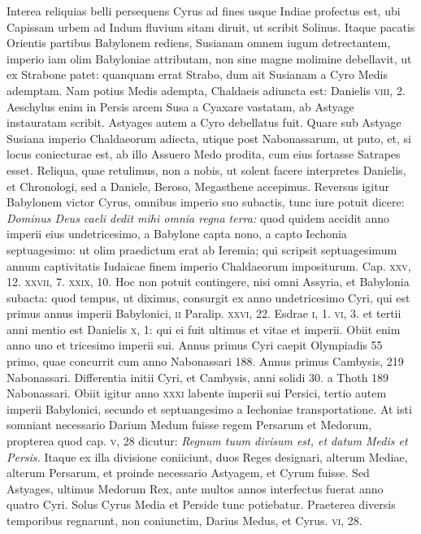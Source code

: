 \begin{parnumbers}
{}
\lnr{}Interea reliquias belli persequens
Cyrus ad fines usque Indiae profectus est, ubi Capissam urbem
ad Indum fluvium sitam diruit, ut scribit Solinus.
\lnr{}Itaque pacatis Orientis partibus Babylonem rediens, Susianam omnem iugum
detrectantem, imperio iam olim Babyloniae attributam, non
sine magne molimine debellavit, ut ex Strabone patet: quanquam
errat Strabo, dum ait Susianam a Cyro Medis ademptam.
\lnr{}Nam
potius Medis adempta, Chaldaeis adiuncta est: Danielis \textsc{viii}, 2.
\lnr{}Aeschylus enim in Persis arcem Susa a Cyaxare vastatam, ab Astyage
instauratam scribit.
\lnr{}Astyages autem a Cyro debellatus fuit.
\lnr{}Quare sub Astyage Susiana imperio Chaldaeorum adiecta, utique
post Nabonassarum, ut puto, et, si locus coniecturae est, ab illo
Assuero Medo prodita, cum eius fortasse Satrapes esset.
\lnr{}Reliqua,
quae retulimus, non a nobis, ut solent facere interpretes Danielis,
et Chronologi, sed a Daniele, Beroso, Megasthene accepimus.
\lnr{}Reversus igitur Babylonem victor Cyrus, omnibus imperio suo
subactis, tunc iure potuit dicere: \textit{Dominus Deus caeli dedit mihi omnia
regna terra:} quod quidem accidit anno imperii eius undetricesimo,
a Babylone capta nono, a capto Iechonia septuagesimo: ut
olim praedictum erat ab Ieremia; qui scripsit septuagesimum annum
captivitatis Iudaicae finem imperio Chaldaeorum impositurum.
\lnr{}Cap. \textsc{xxv}, 12. \textsc{xxvii}, 7. \textsc{xxix}, 10.
\lnr{}Hoc non potuit contingere,
nisi omni Assyria, et Babylonia subacta: quod tempus,
ut diximus, consurgit ex anno undetricesimo Cyri, qui est primus
annus imperii Babylonici, \textsc{ii} Paralip. \textsc{xxvi}, 22.
\lnr{}Esdrae \textsc{i}, 1.
\textsc{vi}, 3. et tertii anni mentio est Danielis \textsc{x}, 1: qui ei fuit
 ultimus et
 vitae et imperii.
\lnr{}Obiit enim anno uno et tricesimo imperii sui.
\lnr{}Annus primus Cyri caepit Olympiadis 55 primo, quae concurrit cum
anno Nabonassari 188.
\lnr{}Annus primus Cambysis, 219 Nabonassari.
\lnr{}Differentia initii Cyri, et Cambysis, anni solidi 30. a Thoth
189 Nabonassari.
\lnr{}Obiit igitur anno \textsc{xxxi} labente imperii sui Persici,
tertio autem imperii Babylonici, secundo et septuangesimo a
Iechoniae transportatione.
\lnr{}At isti somniant necessario Darium Medum
fuisse regem Persarum et Medorum, propterea quod cap. \textsc{v},
28 dicutur: \textit{Regnum tuum divisum est, et datum Medis et Persis.}
\lnr{}Itaque ex illa divisione coniiciunt, duos Reges designari, alterum
Mediae, alterum Persarum, et proinde necessario Astyagem, et
Cyrum fuisse.
\lnr{}Sed Astyages, ultimus Medorum Rex, ante multos
annos interfectus fuerat anno quatro Cyri.
\lnr{}Solus Cyrus Media et
Perside tunc potiebatur.
\lnr{}Praeterea diversis temporibus regnarunt,
non coniunctim, Darius Medus, et Cyrus. \textsc{vi}, 28.


\end{parnumbers}
